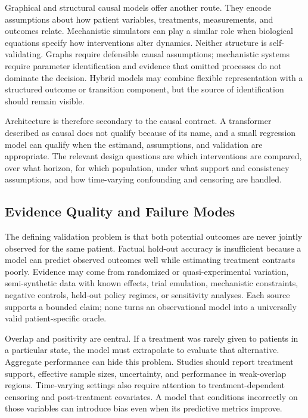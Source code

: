 Graphical and structural causal models offer another route. They encode assumptions about how patient variables, treatments, measurements, and outcomes relate. Mechanistic simulators can play a similar role when biological equations specify how interventions alter dynamics. Neither structure is self-validating. Graphs require defensible causal assumptions; mechanistic systems require parameter identification and evidence that omitted processes do not dominate the decision. Hybrid models may combine flexible representation with a structured outcome or transition component, but the source of identification should remain visible.

Architecture is therefore secondary to the causal contract. A transformer described as causal does not qualify because of its name, and a small regression model can qualify when the estimand, assumptions, and validation are appropriate. The relevant design questions are which interventions are compared, over what horizon, for which population, under what support and consistency assumptions, and how time-varying confounding and censoring are handled.

\subsection{Evidence Quality and Failure Modes}

The defining validation problem is that both potential outcomes are never jointly observed for the same patient. Factual hold-out accuracy is insufficient because a model can predict observed outcomes well while estimating treatment contrasts poorly. Evidence may come from randomized or quasi-experimental variation, semi-synthetic data with known effects, trial emulation, mechanistic constraints, negative controls, held-out policy regimes, or sensitivity analyses. Each source supports a bounded claim; none turns an observational model into a universally valid patient-specific oracle.

Overlap and positivity are central. If a treatment was rarely given to patients in a particular state, the model must extrapolate to evaluate that alternative. Aggregate performance can hide this problem. Studies should report treatment support, effective sample sizes, uncertainty, and performance in weak-overlap regions. Time-varying settings also require attention to treatment-dependent censoring and post-treatment covariates. A model that conditions incorrectly on those variables can introduce bias even when its predictive metrics improve.

